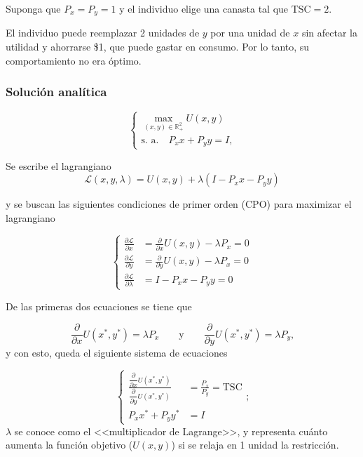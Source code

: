 \documentclass{report}
\begin{document}
Suponga que $P_x=P_y=1$ y el individuo elige una canasta tal que $\mathrm{TSC}=2$.

El individuo puede reemplazar 2 unidades de $y$ por una unidad de $x$ sin afectar la utilidad y ahorrarse \$1, que puede gastar en consumo. Por lo tanto, su comportamiento no era óptimo.

\subsubsection{Solución analítica}

$$\left\{
\begin{matrix}
\displaystyle{\max_{(x,y)\in\mathbb{R}_+^2}U\!\left(x,y\right)} \\
\text{s. a.}\quad P_xx+P_yy=I\text{,}
\end{matrix}\right.$$

Se escribe el lagrangiano
$$\mathscr{L}\!\left(x,y,\lambda\right)=U\!\left(x,y\right)+\lambda\left(I-P_xx-P_yy\right)$$

y se buscan las siguientes condiciones de primer orden (CPO) para maximizar el lagrangiano

\[
\left\{
\begin{aligned}
\frac{\partial\mathscr{L}}{\partial x} & = \frac{\partial}{\partial x}U\!\left(x,y\right)-\lambda P_x=0 \\
\frac{\partial\mathscr{L}}{\partial y} & = \frac{\partial}{\partial y}U\!\left(x,y\right)-\lambda P_x=0 \\
\frac{\partial\mathscr{L}}{\partial \lambda} & = I-P_xx-P_yy=0
\end{aligned}
\right.
\]

De las primeras dos ecuaciones se tiene que

$$\frac{\partial}{\partial x}U\!\left(x^*,y^*\right)=\lambda P_x\qquad\text{y}\qquad\frac{\partial}{\partial y}U\!\left(x^*,y^*\right)=\lambda P_y\text{,}$$
y con esto, queda el siguiente sistema de ecuaciones

\[
\left\{
\begin{aligned}
\frac{\dfrac{\partial}{\partial x}U\!\left(x^*,y^*\right)}{\dfrac{\partial}{\partial y}U\!\left(x^*,y^*\right)}&=\frac{P_x}{P_y}=\mathrm{TSC} \\
P_xx^*+P_yy^*&=I
\end{aligned}
\right.\text{;}
\]
$\lambda$ se conoce como el <<multiplicador de Lagrange>>, y representa cuánto aumenta la función objetivo ($U\!\left(x,y\right)$) si se relaja en 1 unidad la restricción.
\end{document}

